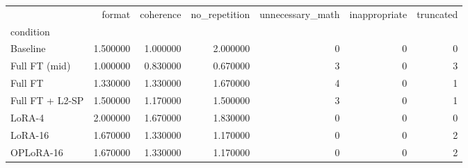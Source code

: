 \begin{tabular}{lrrrrrr}
\toprule
 & format & coherence & no_repetition & unnecessary_math & inappropriate & truncated \\
condition &  &  &  &  &  &  \\
\midrule
Baseline & 1.500000 & 1.000000 & 2.000000 & 0 & 0 & 0 \\
Full FT (mid) & 1.000000 & 0.830000 & 0.670000 & 3 & 0 & 3 \\
Full FT & 1.330000 & 1.330000 & 1.670000 & 4 & 0 & 1 \\
Full FT + L2-SP & 1.500000 & 1.170000 & 1.500000 & 3 & 0 & 1 \\
LoRA-4 & 2.000000 & 1.670000 & 1.830000 & 0 & 0 & 0 \\
LoRA-16 & 1.670000 & 1.330000 & 1.170000 & 0 & 0 & 2 \\
OPLoRA-16 & 1.670000 & 1.330000 & 1.170000 & 0 & 0 & 2 \\
\bottomrule
\end{tabular}
